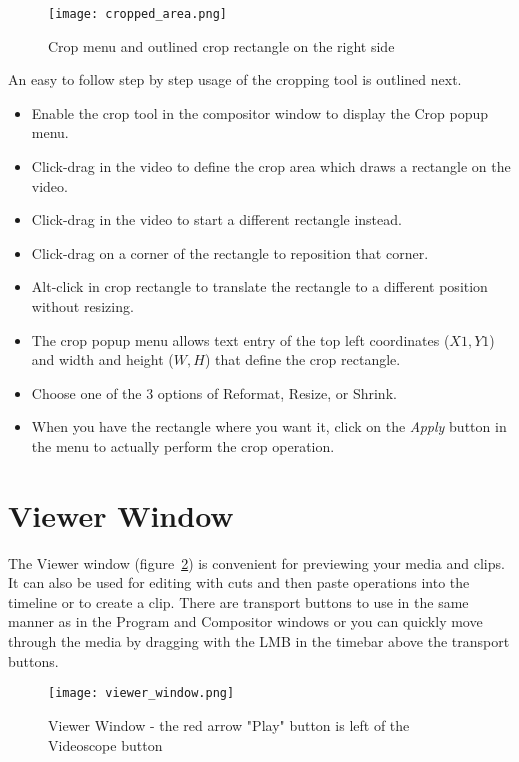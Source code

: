 \begin{figure}[htpb]
    \centering
    \texttt{[image: cropped\_area.png]}
    \caption{Crop menu and outlined crop rectangle on the right side}
    \label{fig:cropped_area}
\end{figure}

An easy to follow step by step usage of the cropping tool is outlined next.
\begin{itemize}
    \item Enable the crop tool in the compositor window to display the Crop popup menu.
    \item Click-drag in the video to define the crop area which draws a rectangle on the video.
    \item Click-drag in the video to start a different rectangle instead.
    \item Click-drag on a corner of the rectangle to reposition that corner.
    \item Alt-click in crop rectangle to translate the rectangle to a different position without resizing.
    \item The crop popup menu allows text entry of the top left coordinates ($X1,Y1$) and width and
height ($W, H$) that define the crop rectangle. 
    \item Choose one of the 3 options of Reformat, Resize, or Shrink.
    \item When you have the rectangle where you want it,
click on the \emph{Apply} button in the menu to actually perform the crop operation.
\end{itemize}
 

\section{Viewer Window}%
\label{sec:viewer_window}

The Viewer window (figure~\ref{fig:viewer_window}) is convenient for previewing your media and 
clips. It can also be used for editing with cuts and then paste operations into the timeline or
to create a clip.  There are transport buttons to use in the same manner as in the Program
and Compositor windows or you can quickly move through the media by dragging with the LMB in
the timebar above the transport buttons.  

\begin{figure}[htpb]
    \centering
    \texttt{[image: viewer\_window.png]}
    \caption{Viewer Window - the red arrow "Play" button is left of the Videoscope button}
    \label{fig:viewer_window}
\end{figure}

